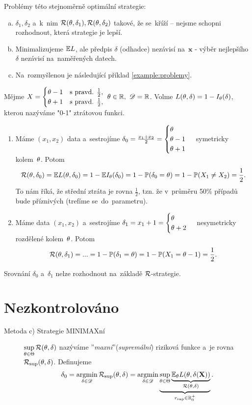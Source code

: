 \begin{description}
	Problémy této stejnoměrně optimální strategie: \begin{enumerate}[a)]
		\item $\delta_1,\delta_2$ a~k~nim $\mathcal{R}(\theta,\delta_1),\mathcal{R}(\theta,\delta_2)$ takové, že se~kříží -- nejsme schopni rozhodnout, která strategie je lepší.
		\item Minimalizujeme $\mathbb{E} L$, ale předpis $\delta$ (odhadce) nezávisí na~$\textbf{x}$ - výběr nejlepšího $\delta$ nezávisí na~naměřených datech.
		\item Na~rozmyšlenou je následující příklad \ref{example:problemy}.
	\end{enumerate}
\end{description}

\begin{example} \label{example:problemy}
	Mějme $X=\begin{cases}
	\theta-1 & \text{s pravd. } \frac{1}{2}, \\ \theta+1 & \text{s pravd. } \frac{1}{2},
	\end{cases}~\theta\in\mathbb{R},~\mathscr{D}=\mathbb{R}$. Volme
	$ L(\theta,\delta)=1-I_\theta(\delta)$, kterou nazýváme "0-1" ztrátovou funkci.
	
	\begin{enumerate}[1)]
		\item Máme $(x_1,x_2)$ data a~sestrojíme $\delta_0=\frac{x_1+x_2}{2}=\begin{cases}
		\theta\\\theta-1\\\theta+1
		\end{cases}$ symetricky kolem~$\theta$. Potom
		$$ \mathcal{R}(\theta,\delta_0)=\mathbb{E} L(\theta,\delta_0)=1-\mathbb{E} I_\theta(\delta_0)=1-\mathbb{P}(\delta_0=\theta)=1-\mathbb{P}(X_1\neq X_2)=\frac{1}{2}.$$ To nám říká, že střední ztráta je rovna $\frac{1}{2}$, tzn. že v~průměru 50\% případů bude příznivých (trefíme se~do~parametru).
		\item Máme data $(x_1,x_2)$ a~sestrojíme $\delta_1=x_1+1=\begin{cases}
		\theta\\\theta+2
		\end{cases}$ nesymetricky rozdělené kolem~$\theta$. Potom
		$$\mathcal{R}(\theta,\delta_1)=...=1-\mathbb{P}(\delta_1=\theta)=1-\mathbb{P}(X_1=\theta-1)=\frac{1}{2}.$$
	\end{enumerate}
	Srovnání $\delta_0$ a~$\delta_1$ nelze rozhodnout na~základě $\mathcal{R}$-strategie. 
\end{example}

\chapter{Nezkontrolováno}
\begin{description}
	\item[Metoda c) Strategie MINIMAXní] $\sup\limits_{\theta\in\Theta} \mathcal{R}(\theta,\delta)$ nazýváme ''\textit{maxní}''(\textit{supremální}) riziková funkce a~je rovna $\mathcal{R}_{\sup}(\theta,\delta)$. Definujeme 
	$$ \delta_0=\mathop{\mathrm{argmin}}\limits_{\delta\in\mathscr{D}}\mathcal{R}_{\sup}(\theta,\delta)=\mathop{\mathrm{argmin}}\limits_{\delta\in\mathscr{D}}\underbrace{\sup\limits_{\theta\in\Theta}\underbrace{\mathbb{E}_\theta L(\theta,\delta(\textbf{X}))}_{\mathcal{R}(\theta,\delta)}}_{r_{\sup}\in\mathbb{R}_0^+}.$$
\end{description}

